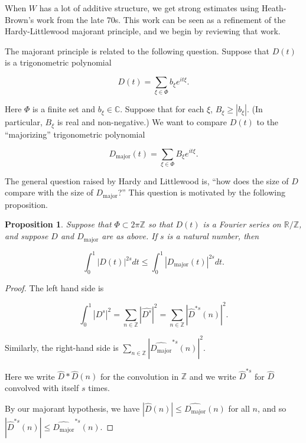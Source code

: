\documentclass{amsart}
\newtheorem{prop}{Proposition}[section]
\newcommand{\CC}{\mathbb{C}}
\newcommand{\ZZ}{\mathbb{Z}}
\newcommand{\RR}{\mathbb{R}}
\begin{document}
When $W$ has a lot of additive structure, we get strong estimates using Heath-Brown's work \cite{HB} from the late 70s. 
This work can be seen as a refinement of the Hardy-Littlewood majorant principle, and we begin by reviewing that work.

The majorant principle is related to the following question.
Suppose that $D(t)$ is a trigonometric polynomial

\begin{equation} \label{Dtrigpoly} D(t) = \sum_{\xi \in \Phi} b_{\xi} e^{i t \xi}.
\end{equation}

\noindent Here $\Phi$ is a finite set and $b_\xi \in \CC$.  Suppose that for each $\xi$,  $B_\xi \ge |b_\xi|$.  (In particular, $B_\xi$ is real and non-negative.)   We want to compare $D(t)$ to the ``majorizing'' trigonometric polynomial

\newcommand{\Dmaj}{D_{\textrm{major}}}

\begin{equation} \label{Dtrigpoly} \Dmaj(t) = \sum_{\xi \in \Phi} B_{\xi} e^{i t \xi}.
\end{equation}

\noindent The general question raised by Hardy and Littlewood is,  ``how does the size of $D$ compare with the size of $\Dmaj$?''  This question is motivated by the following proposition.

\begin{prop} \label{propHLeven} Suppose that $\Phi \subset 2 \pi \ZZ$ so that $D(t)$ is a Fourier series on $\RR / \ZZ$,  and suppose $D$ and $\Dmaj$ are as above.   If $s$ is a natural number,  then

$$\int_0^1 |D(t)|^{2s} dt \le \int_0^1 | \Dmaj (t) |^{2s} dt. $$

\end{prop}

\begin{proof} The left hand side is

$$ \int_0^1 | D^s |^2 = \sum_{n \in \ZZ} \left| \widehat{D^s} \right|^2 = \sum_{n \in \ZZ} \left| \hat D^{*s}(n) \right|^2. $$

Similarly, the right-hand side is $ \sum_{n \in \ZZ} \left| \widehat{ \Dmaj}^{*s}(n) \right|^2. $

Here we write $\hat D * \hat D( n )$ for the convolution in $\ZZ$ and we write $\hat D^{*s}$ for $\hat D$ convolved with itself $s$ times.    

By our majorant hypothesis,  we have $|\hat D(n)| \le \widehat{ \Dmaj}(n)$ for all $n$,  and so $| \hat D^{*s}(n) | \le \widehat {\Dmaj}^{*s} (n)$.  
\end{proof}
\end{document}
